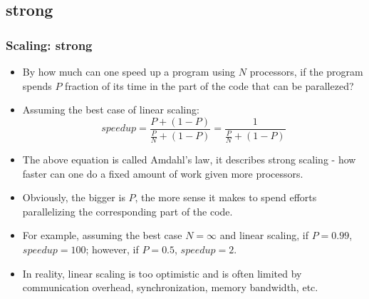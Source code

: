 \subsection{strong}
\begin{frame}[fragile]
  \frametitle{Scaling: strong}
\begin{itemize}
\item By how much can one speed up a program using $N$ processors, if the program spends $P$ fraction of its time in the part of the code that can be parallezed?
\item Assuming the best case of {\color{mycolordef}linear scaling}:
\begin{equation*}
speedup = \frac{P + (1 - P)}{\frac{P}{N} + (1 - P)} = \frac{1}{\frac{P}{N} + (1 - P)}
\end{equation*}
\item The above equation is called {\color{mycolordef}Amdahl's law}, it describes {\color{mycolordef}strong scaling} - how faster can one do a fixed amount of work given more processors.
\item Obviously, the bigger is $P$, the more sense it makes to spend efforts parallelizing the corresponding part of the code.
\item For example, assuming the best case $N=\infty$ and linear scaling, if $P=0.99$, $speedup = 100$; however, if $P=0.5$, $speedup=2$. 
\item In reality, linear scaling is too optimistic and is often limited by communication overhead, synchronization, memory bandwidth, etc.
\end{itemize}
\end{frame}
